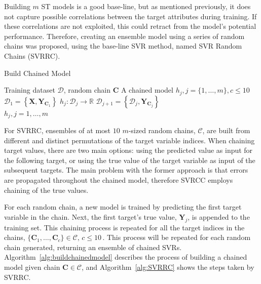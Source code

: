 \documentclass[reqno]{vcuthesis}
\newcommand{\set}[1]{{\left\{#1\right\}}}
\numberwithin{equation}{chapter}
\begin{document}
Building $m$ ST models is a good base-line, but as mentioned previously, it does not capture possible correlations between the target attributes during training. If these correlations are not exploited, this could retract from the model's potential performance. Therefore, creating an ensemble model using a series of random chains was proposed, using the base-line SVR method, named SVR Random Chains (SVRRC). 
\begin{algorithm}[t!]
\centering \small
\caption{Build Chained Model}
\label{alg:buildchainedmodel} 
\begin{algorithmic}[1]
\renewcommand{\algorithmicrequire}{\textbf{Input:}}
\renewcommand{\algorithmicensure}{\textbf{Output:}}
\Require Training dataset $\mathcal{D}$, random chain $\bm C$
\Ensure  A chained model $h_j, j = \{1,\ldots,m\}, c \leq 10$
\State $\mathcal{D}_1 = \set{\bm X, \bm Y_{\bm C_1}}$ 
 
\State $h_j : \mathcal{D}_j \rightarrow \mathbb{R}$ 
\State $\mathcal{D}_{j+1} = \set{\mathcal{D}_j, \bm Y_{\bm C_j}}$ 
\EndIf
\EndFor \\
\Return $h_j, j=1,\ldots,m$ 
\end{algorithmic} 
\end{algorithm}

For SVRRC, ensembles of at most $10$ $m$-sized random chains, $\mathcal{C}$, are built from different and distinct permutations of the target variable indices. When chaining target values, there are two main options: using the predicted value as input for the following target, or using the true value of the target variable as input of the subsequent targets. The main problem with the former approach is that errors are propagated throughout the chained model, therefore SVRCC employs chaining of the true values. 

For each random chain, a new model is trained by predicting the first target variable in the chain. Next, the first target's true value, $\bm Y_j$, is appended to the training set. This chaining process is repeated for all the target indices in the chains, $\{\bm C_1, \ldots, \bm C_c\} \in \mathcal{C}, \, c \leq 10 \,$. This process will be repeated for each random chain generated, returning an ensemble of chained SVRs. Algorithm~\ref{alg:buildchainedmodel} describes the process of building a chained model given chain $\bm C \in \mathcal{C}$, and Algorithm~\ref{alg:SVRRC} shows the steps taken by SVRRC. 
\end{document}
